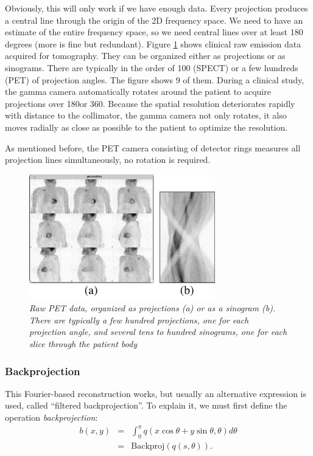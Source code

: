 Obviously, this will only work if we have enough data. Every projection
produces a central line through the origin of the 2D frequency space. We need
to have an estimate of the entire frequency space, so we need central lines
over at least 180 degrees (more is fine but redundant).  Figure
\ref{fig:jnproj_sino} shows clinical raw emission data acquired for
tomography. They can be organized either as projections or as
sinograms. There are typically in the order of 100 (SPECT) or a few hundreds
(PET) of projection angles. The figure shows 9 of them. During a clinical
study, the gamma camera automatically rotates around the patient to acquire
projections over 180\textdegree or 360\textdegree. Because the spatial resolution
deteriorates rapidly with distance to the collimator, the gamma camera not
only rotates, it also moves radially as close as possible to the patient to
optimize the resolution.

As mentioned before, the PET camera consisting of detector rings measures all
projection lines simultaneously, no rotation is required.

\begin{figure}[tb]
\centering
\includegraphics[width=0.72\textwidth]{figs/fig_jnproj_sino.pdf}
\caption{\label{fig:jnproj_sino} \emph{Raw PET data, organized as projections
(a) or as a sinogram (b). There are typically a few hundred projections, one
for each projection angle, and several tens to hundred sinograms, one
for each slice through the patient body}}
\end{figure}


\subsubsection{Backprojection} \label{sec:backprojection}
This Fourier-based reconstruction works, but usually an alternative expression
is used, called ``filtered backprojection''. To explain it, we must first define
the operation {\em backprojection}:
\begin{align}
 b(x,y) & = & \int_0^\pi q(x \cos \theta + y \sin \theta, \theta) d \theta
             \nonumber\\
      & = & \mbox{Backproj} \left( q(s, \theta) \right). \label{eq:jnbackproj}
\end{align}

